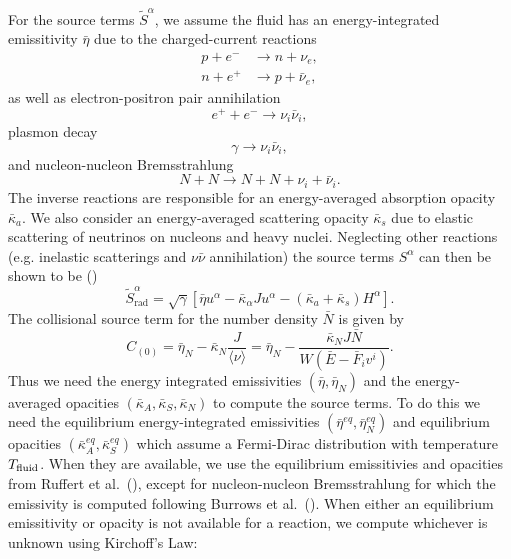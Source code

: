 For the source terms $\tilde{S}^\alpha$, we assume the fluid has an energy-integrated emissitivity $\bar \eta$ due to the charged-current reactions
%
\begin{align}
  p + e^- &\rightarrow n + \nu_e, \\
  n + e^+ &\rightarrow p + \bar{\nu}_e,
\end{align}
%
as well as electron-positron pair annihilation
%
\begin{equation}
  e^+ + e^- \rightarrow \nu_i \bar \nu_i,
\end{equation}
%
plasmon decay
%
\begin{equation}
  \gamma \rightarrow \nu_i\bar \nu_i,
\end{equation}
%
and nucleon-nucleon Bremsstrahlung
%
\begin{equation}
  N + N \rightarrow N + N + \nu_i + \bar \nu_i.
\end{equation}
%
The inverse reactions are responsible for an energy-averaged absorption opacity $\bar \kappa_a$. We also consider an energy-averaged scattering opacity $\bar \kappa_s$ due to elastic scattering of neutrinos on nucleons and heavy nuclei. Neglecting other reactions (e.g. inelastic scatterings and $\nu\bar\nu$ annihilation) the source terms $S^\alpha$ can then be shown to be (\cite{shibata2011truncated})
%
\begin{equation}
  \tilde S_\text{rad}^\alpha = \sqrt{\gamma} [\bar \eta u^\alpha - \bar \kappa_\alpha J u^\alpha - (\bar \kappa_a + \bar \kappa_s) H^\alpha].
\end{equation}
%
The collisional source term for the number density $\bar N$ is given by
%
\begin{equation}
  C_{(0)} = \bar \eta_N - \bar \kappa_N \frac{J}{\langle\nu\rangle} = \bar \eta_N - \frac{\bar \kappa_N J \bar N}{W(\bar E - \bar F_iv^i)}.
\end{equation}
%
Thus we need the energy integrated emissivities $(\bar \eta, \bar \eta_N)$ and the energy-averaged opacities $(\bar \kappa_A, \bar \kappa_S, \bar \kappa_N)$ to compute the source terms. To do this we need the equilibrium energy-integrated emissivities $(\bar \eta^{eq}, \bar \eta^{eq}_N)$ and equilibrium opacities $(\bar \kappa^{eq}_A, \bar \kappa^{eq}_S)$ which assume a Fermi-Dirac distribution with temperature $T_{\rm fluid}$. When they are available, we use the equilibrium emissitivies and opacities from Ruffert et al.~(\cite{ruffert1996}), except for nucleon-nucleon Bremsstrahlung for which the emissivity is computed following Burrows et al.~(\cite{burrows2006b}). When either an equilibrium emissitivity or opacity is not available for a reaction, we compute whichever is unknown using Kirchoff's Law:

